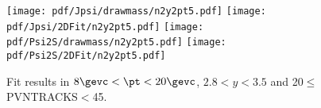 \begin{figure}[H]
\begin{center}
\texttt{[image: pdf/Jpsi/drawmass/n2y2pt5.pdf]}
\texttt{[image: pdf/Jpsi/2DFit/n2y2pt5.pdf]}
\vspace*{-0.5cm}
\texttt{[image: pdf/Psi2S/drawmass/n2y2pt5.pdf]}
\texttt{[image: pdf/Psi2S/2DFit/n2y2pt5.pdf]}
\vspace*{-0.5cm}
\end{center}
\caption{Fit results in $8\gevc<\pt<20\gevc$, $2.8<y<3.5$ and 20$\leq$PVNTRACKS$<$45.}
\label{Fitn2y2pt5}
\end{figure}
